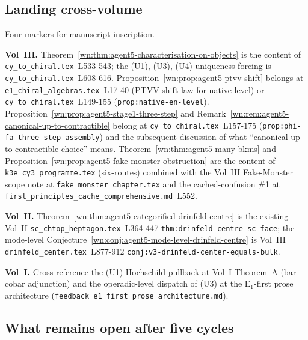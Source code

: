 \subsection*{Landing cross-volume}

Four markers for manuscript inscription.

\textbf{Vol~III.} Theorem~\ref{wn:thm:agent5-characterisation-on-objects}
is the content of \texttt{cy\_to\_chiral.tex}~L533-543; the (U1), (U3),
(U4) uniqueness forcing is \texttt{cy\_to\_chiral.tex}~L608-616.
Proposition~\ref{wn:prop:agent5-ptvv-shift} belongs at
\texttt{e1\_chiral\_algebras.tex}~L17-40 (PTVV shift law for native
level) or \texttt{cy\_to\_chiral.tex}~L149-155 (\texttt{prop:native-en-level}).
Proposition~\ref{wn:prop:agent5-stage1-three-step} and
Remark~\ref{wn:rem:agent5-canonical-up-to-contractible} belong at
\texttt{cy\_to\_chiral.tex}~L157-175
(\texttt{prop:phi-fa-three-step-assembly}) and the subsequent discussion
of what ``canonical up to contractible choice'' means.
Theorem~\ref{wn:thm:agent5-many-bkms} and
Proposition~\ref{wn:prop:agent5-fake-monster-obstruction} are the
content of \texttt{k3e\_cy3\_programme.tex} (six-routes) combined with
the Vol~III Fake-Monster scope note at \texttt{fake\_monster\_chapter.tex}
and the cached-confusion \#1 at \texttt{first\_principles\_cache\_comprehensive.md}~L552.

\textbf{Vol~II.} Theorem~\ref{wn:thm:agent5-categorified-drinfeld-centre}
is the existing Vol~II \texttt{sc\_chtop\_heptagon.tex}~L364-447
\texttt{thm:drinfeld-centre-sc-face}; the mode-level
Conjecture~\ref{wn:conj:agent5-mode-level-drinfeld-centre} is
Vol~III \texttt{drinfeld\_center.tex}~L877-912
\texttt{conj:v3-drinfeld-center-equals-bulk}.

\textbf{Vol~I.} Cross-reference the (U1) Hochschild pullback at
Vol~I Theorem~A (bar-cobar adjunction) and the operadic-level
dispatch of (U3) at the E$_1$-first prose architecture
(\texttt{feedback\_e1\_first\_prose\_architecture.md}).

\subsection*{What remains open after five cycles}

